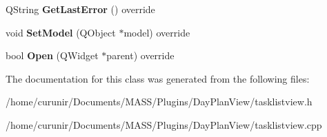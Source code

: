 \begin{DoxyCompactItemize}
\item 
Q\+String {\bfseries Get\+Last\+Error} () override\hypertarget{class_task_list_view_af853529bf8207791465cb624c51f4850}{}\label{class_task_list_view_af853529bf8207791465cb624c51f4850}

\item 
void {\bfseries Set\+Model} (Q\+Object $\ast$model) override\hypertarget{class_task_list_view_a4f0f460ebfe6cef171b0434047ea9df3}{}\label{class_task_list_view_a4f0f460ebfe6cef171b0434047ea9df3}

\item 
bool {\bfseries Open} (Q\+Widget $\ast$parent) override\hypertarget{class_task_list_view_ac621ebd978d94c696aa0636560c4ea39}{}\label{class_task_list_view_ac621ebd978d94c696aa0636560c4ea39}

\end{DoxyCompactItemize}


The documentation for this class was generated from the following files\+:\begin{DoxyCompactItemize}
\item 
/home/curunir/\+Documents/\+M\+A\+S\+S/\+Plugins/\+Day\+Plan\+View/tasklistview.\+h\item 
/home/curunir/\+Documents/\+M\+A\+S\+S/\+Plugins/\+Day\+Plan\+View/tasklistview.\+cpp\end{DoxyCompactItemize}
